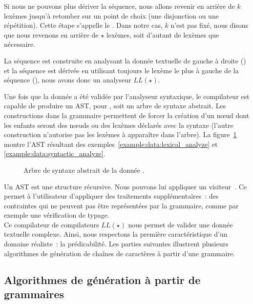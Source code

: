 Si nous ne pouvons plus dériver la séquence, nous allons revenir en arrière de
$k$ lexèmes jusqu'à retomber sur un point de choix (une disjonction ou une
répétition). Cette étape s'appelle le . Dans notre cas,
$k$ n'est pas fixé, nous disons que nous revenons en arrière de $\star$ lexèmes,
soit d'autant de lexèmes que nécessaire.

La séquence est construite en analysant la donnée textuelle de gauche à droite
() et la séquence est dérivée en utilisant
toujours le lexème le plus à gauche de la séquence (), nous avons donc un analyseur $LL(\star)$.

Une fois que la donnée a été validée par l'analyseur syntaxique, le compilateur
est capable de produire un AST, pour , soit un
arbre de syntaxe abstrait. Les constructions  dans la grammaire
permettent de forcer la création d'un nœud dont les enfants seront des nœuds ou
des lexèmes déclarés avec la syntaxe  (l'autre construction
 n'autorise pas les lexèmes à apparaître dans l'arbre). La
figure~\ref{figure:data:ast} montre l'AST résultant des
exemples~\ref{example:data:lexical_analyze} et
\ref{example:data:syntactic_analyze}.
%
\begin{figure}


\caption[Arbre de syntaxe abstrait.]{\label{figure:data:ast} Arbre de syntaxe
abstrait de la donnée .}

\end{figure}
%
Un AST est une structure récursive. Nous pouvons lui appliquer un {\strong
visiteur}~. Ce  permet à
l'utilisateur d'appliquer des traitements supplémentaires~: des contraintes qui
ne peuvent pas être représentées par la grammaire, comme par exemple une
vérification de typage. \\

Ce compilateur de compilateurs $LL(\star)$ nous permet de valider une donnée
textuelle complexe. Ainsi, nous respectons la première caractéristique d'un
domaine réaliste~: la prédicabilité. Les parties suivantes illustrent plusieurs
algorithmes de génération de chaînes de caractères à partir d'une grammaire.

\subsection{Algorithmes de génération à partir de grammaires}
\label{subsection:data:algorithms}

